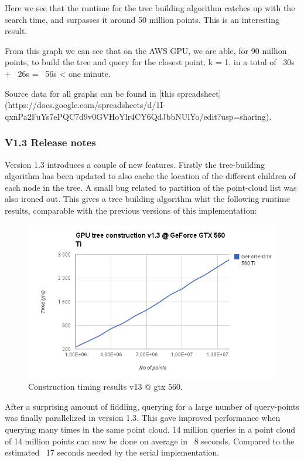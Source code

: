 \begin{enumerate}
\begin{enumerate}
Here we see that the runtime for the tree building algorithm catches up with the search time, and surpasses it around 50 million points. This is an interesting result.

From this graph we can see that on the AWS GPU, we are able, for 90 million points, to build the tree and query for the closest point, k = 1, in a total of ~30s + ~26s = ~56s < one minute.

Source data for all graphs can be found in [this spreadsheet](https://docs.google.com/spreadsheets/d/1I-qxnPa2FuYs7ePQC7d9v0GVHoYlr4CY6QdJbbNUlYo/edit?usp=sharing).


\subsubsection{V1.3 Release notes} %
\label{ssub:v13_release_notes}

Version 1.3 introduces a couple of new features. Firstly the tree-building algorithm has been updated to also cache the location of the different children of each node in the tree. A small bug related to partition of the point-cloud list was also ironed out. This gives a tree building algorithm whit the following runtime results, comparable with the previous versions of this implementation:

\begin{figure}[ht!]
\centering
\includegraphics[width=120mm]{gfx/construction_v13_gtx_560.png}

\caption{Construction timing results v13 @ gtx 560.}
\label{fig:construction_v13_gtx_560}
\end{figure}

After a surprising amount of fiddling, querying for a large number of query-points was finally parallelized in version 1.3. This gave improved performance when querying many times in the same point cloud. 14 million queries in a point cloud of 14 million points can now be done on average in ~8 seconds. Compared to the estimated ~17 seconds needed by the serial implementation.


\end{enumerate}
\end{enumerate}
